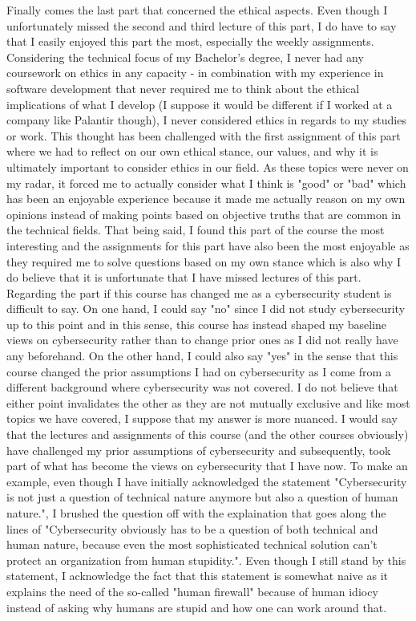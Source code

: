 \documentclass[12pt]{article}
\begin{document}
Finally comes the last part that concerned the ethical aspects. Even though I unfortunately missed the second and third lecture of this part, I do have to say that I easily enjoyed this part the most, especially the weekly assignments. Considering the technical focus of my Bachelor's degree, I never had any coursework on ethics in any capacity - in combination with my experience in software development that never required me to think about the ethical implications of what I develop (I suppose it would be different if I worked at a company like Palantir though), I never considered ethics in regards to my studies or work. This thought has been challenged with the first assignment of this part where we had to reflect on our own ethical stance, our values, and why it is ultimately important to consider ethics in our field. As these topics were never on my radar, it forced me to actually consider what I think is "good" or "bad" which has been an enjoyable experience because it made me actually reason on my own opinions instead of making points based on objective truths that are common in the technical fields. That being said, I found this part of the course the most interesting and the assignments for this part have also been the most enjoyable as they required me to solve questions based on my own stance which is also why I do believe that it is unfortunate that I have missed lectures of this part.
\newline
Regarding the part if this course has changed me as a cybersecurity student is difficult to say. On one hand, I could say "no" since I did not study cybersecurity up to this point and in this sense, this course has instead shaped my baseline views on cybersecurity rather than to change prior ones as I did not really have any beforehand. On the other hand, I could also say "yes" in the sense that this course changed the prior assumptions I had on cybersecurity as I come from a different background where cybersecurity was not covered. I do not believe that either point invalidates the other as they are not mutually exclusive and like most topics we have covered, I suppose that my answer is more nuanced. I would say that the lectures and assignments of this course (and the other courses obviously) have challenged my prior assumptions of cybersecurity and subsequently, took part of what has become the views on cybersecurity that I have now. 
\newline
To make an example, even though I have initially acknowledged the statement "Cybersecurity is not just a question of technical nature anymore but also a question of human nature.", I brushed the question off with the explaination that goes along the lines of "Cybersecurity obviously has to be a question of both technical and human nature, because even the most sophisticated technical solution can't protect an organization from human stupidity.". Even though I still stand by this statement, I acknowledge the fact that this statement is somewhat naive as it explains the need of the so-called "human firewall" because of human idiocy instead of asking why humans are stupid and how one can work around that. 
\end{document}
